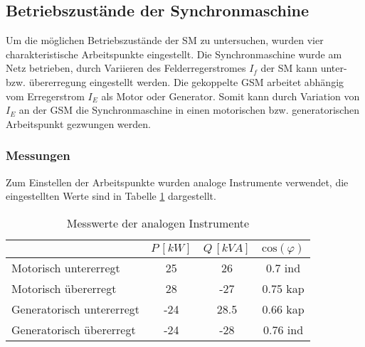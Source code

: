 \subsection{Betriebszustände der Synchronmaschine}
Um die möglichen Betriebszustände der SM zu untersuchen, wurden vier charakteristische Arbeitspunkte eingestellt. Die Synchronmaschine wurde am Netz betrieben, durch Variieren des Felderregerstromes $I_f$ der SM kann unter- bzw. übererregung eingestellt werden. Die gekoppelte GSM arbeitet abhängig vom Erregerstrom $I_E$ als Motor oder Generator. Somit kann durch Variation von $I_E$ an der GSM die Synchronmaschine in einen motorischen bzw. generatorischen Arbeitspunkt gezwungen werden.
\subsubsection{Messungen}
 Zum Einstellen der Arbeitspunkte wurden analoge Instrumente verwendet, die eingestellten Werte sind in Tabelle \ref{tab:betrzustaende_analoge_messungen} dargestellt.


\begin{table}[!ht]
\centering
\begin{tabular}{|l|c|c|c|}
\hline
                          & $P \,[kW]$ & $Q\, [kVA]$ & $\mathrm{cos}(\varphi)$ \\ \hline
Motorisch untererregt     & 25       & 26        & 0.7 ind                                                 \\ \hline
Motorisch übererregt      & 28       & -27       & 0.75 kap                                                \\ \hline
Generatorisch untererregt & -24      & 28.5      & 0.66 kap                                                \\ \hline
Generatorisch übererregt  & -24      & -28       & 0.76 ind                                                \\ \hline
\end{tabular}
\caption{Messwerte der analogen Instrumente}
\label{tab:betrzustaende_analoge_messungen}
\end{table}

